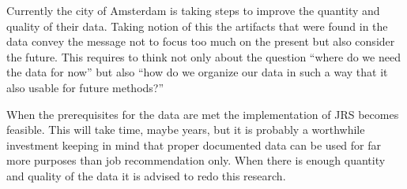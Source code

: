 Currently the city of Amsterdam is taking steps to improve the quantity and quality of their data. 
Taking notion of this the artifacts that were found in the data convey the message not to focus too much on the present but also consider the future.
This requires to think not only about the question “where do we need the data for now” but also “how do we organize our data in such a way that it also usable for future methods?”

When the prerequisites for the data are met the implementation of JRS becomes feasible.
This will take time, maybe years, but it is probably a worthwhile  investment keeping in mind that proper documented data can be used for far more purposes than job recommendation only.
When there is enough quantity and quality of the data it is advised to redo this research. 



